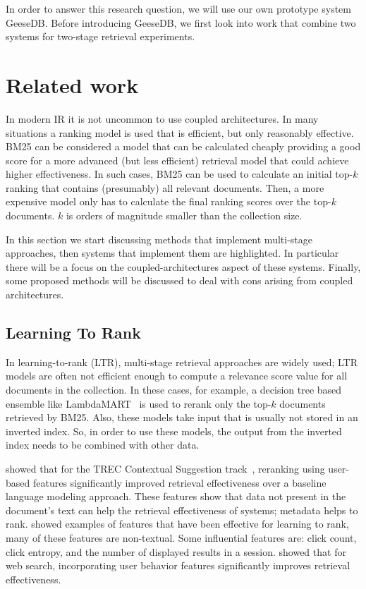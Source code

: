 In order to answer this research question, we will use our own prototype system GeeseDB. Before introducing GeeseDB, we first look into work that combine two systems for two-stage retrieval experiments.


\section{Related work }
In modern IR it is not uncommon to use coupled architectures. In many situations a ranking model is used that is efficient, but only reasonably effective. BM25 can be considered a model that can be calculated cheaply providing a good score for a more advanced (but less efficient) retrieval model that could achieve higher effectiveness. In such cases, BM25 can be used to calculate an initial top-$k$ ranking that contains (presumably) all relevant documents. Then, a more expensive model only has to calculate the final ranking scores over the top-$k$ documents. $k$ is orders of magnitude smaller than the collection size. 

In this section we start discussing methods that implement multi-stage approaches, then systems that implement them are highlighted. In particular there will be a focus on the coupled-architectures aspect of these systems. Finally, some proposed methods will be discussed to deal with cons arising from coupled architectures. 

\subsection{Learning To Rank}
In learning-to-rank (LTR), multi-stage retrieval approaches are widely used; LTR models are often not efficient enough to compute a relevance score value for all documents in the collection.
In these cases, for example, a decision tree based ensemble like LambdaMART~\citep{lambdamart} is used to rerank only the top-$k$ documents retrieved by BM25. Also, these models take input that is usually not stored in an inverted index. So, in order to use these models, the output from the inverted index needs to be combined with other data.

 showed that for the TREC Contextual Suggestion track~\citep{contextual-suggestion-track}, reranking using user-based features significantly improved retrieval effectiveness over a baseline language modeling approach. These features show that data not present in the document's text can help the retrieval effectiveness of systems; metadata helps to rank.  showed examples of features that have been effective for learning to rank, many of these features are non-textual. Some influential features are: click count, click entropy, and the number of displayed results in a session.  showed that for web search, incorporating user behavior features significantly improves retrieval effectiveness.

